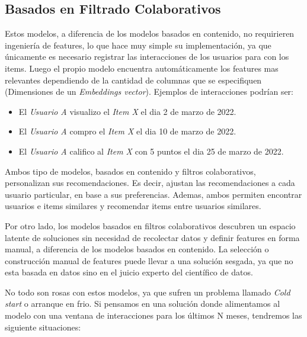 \documentclass[11pt,a4paper,twoside]{thesis}
\begin{document}
\subsection{Basados en Filtrado Colaborativos} 

Estos modelos, a diferencia de los modelos basados en contenido, no requirieren ingeniería de features, lo que hace muy simple su implementación, ya que únicamente es necesario registrar las interacciones de los usuarios para con los items. Luego el propio modelo encuentra automáticamente los features mas relevantes dependiendo de la cantidad de columnas que se especifiquen (Dimensiones de un \textit{Embeddings vector}). Ejemplos de interacciones podrían ser:

\begin{itemize}
	\item El \textit{Usuario A} visualizo el \textit{Item X} el dia 2 de marzo de 2022.
	\item El \textit{Usuario A} compro el \textit{Item X} el dia 10 de marzo de 2022.
	\item El \textit{Usuario A} califico al \textit{Item X} con 5 puntos el dia 25 de marzo de 2022.
\end{itemize}

Ambos tipo de modelos, basados en contenido y filtros colaborativos, personalizan sus recomendaciones. 
Es decir, ajustan las recomendaciones a cada usuario particular, en base a sus preferencias. Ademas, ambos permiten encontrar usuarios e items similares y recomendar items entre usuarios similares.

Por otro lado, los modelos basados en filtros colaborativos descubren un espacio latente de soluciones sin necesidad de recolectar datos y definir features en forma manual, a diferencia de los modelos basados en contenido. La selección o construcción manual de features puede llevar a una solución sesgada, ya que no esta basada en datos sino en el juicio experto del científico de datos. 

No todo son rosas con estos modelos, ya que sufren un problema llamado \textit{Cold start} o arranque en frio. Si pensamos en una solución donde alimentamos al modelo con una ventana de interacciones para los últimos N meses, tendremos las siguiente situaciones:
\end{document}

